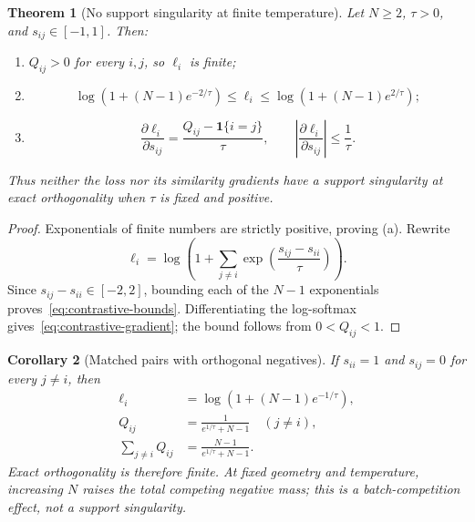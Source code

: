 \documentclass[11pt,a4paper]{article}
\newtheorem{theorem}{Theorem}[section]
\newtheorem{corollary}[theorem]{Corollary}
\theoremstyle{definition}
\theoremstyle{remark}
\begin{document}
\begin{theorem}[No support singularity at finite temperature]
\label{thm:contrastive-finite}
Let $N\ge2$, $\tau>0$, and $s_{ij}\in[-1,1]$.
Then:
\begin{enumerate}[label=(\alph*)]
  \item $Q_{ij}>0$ for every $i,j$, so $\ell_i$ is finite;
  \item
  \begin{equation}
    \log\!\left(1+(N-1)e^{-2/\tau}\right)
    \le \ell_i
    \le
    \log\!\left(1+(N-1)e^{2/\tau}\right);
    \label{eq:contrastive-bounds}
  \end{equation}
  \item
  \begin{equation}
    \frac{\partial\ell_i}{\partial s_{ij}}
    = \frac{Q_{ij}-\mathbf1\{i=j\}}{\tau},
    \qquad
    \left|\frac{\partial\ell_i}{\partial s_{ij}}\right|
    \le\frac1\tau.
    \label{eq:contrastive-gradient}
  \end{equation}
\end{enumerate}
Thus neither the loss nor its similarity gradients have a support singularity at exact orthogonality when $\tau$ is fixed and positive.
\end{theorem}

\begin{proof}
Exponentials of finite numbers are strictly positive, proving (a).
Rewrite
\[
  \ell_i
  = \log\!\left(
      1+\sum_{j\ne i}
      \exp\!\left(\frac{s_{ij}-s_{ii}}{\tau}\right)
    \right).
\]
Since $s_{ij}-s_{ii}\in[-2,2]$, bounding each of the $N-1$ exponentials proves~\eqref{eq:contrastive-bounds}.
Differentiating the log-softmax gives~\eqref{eq:contrastive-gradient}; the bound follows from $0<Q_{ij}<1$.
\end{proof}

\begin{corollary}[Matched pairs with orthogonal negatives]
\label{cor:orthogonal}
If $s_{ii}=1$ and $s_{ij}=0$ for every $j\ne i$, then
\begin{align}
  \ell_i
    &= \log\!\left(1+(N-1)e^{-1/\tau}\right),
    \label{eq:orthogonal-loss} \\
  Q_{ij}
    &= \frac{1}{e^{1/\tau}+N-1}\quad(j\ne i), \\
  \sum_{j\ne i}Q_{ij}
    &= \frac{N-1}{e^{1/\tau}+N-1}.
    \label{eq:negative-mass}
\end{align}
Exact orthogonality is therefore finite.
At fixed geometry and temperature, increasing $N$ raises the total competing negative mass; this is a batch-competition effect, not a support singularity.
\end{corollary}
\end{document}
